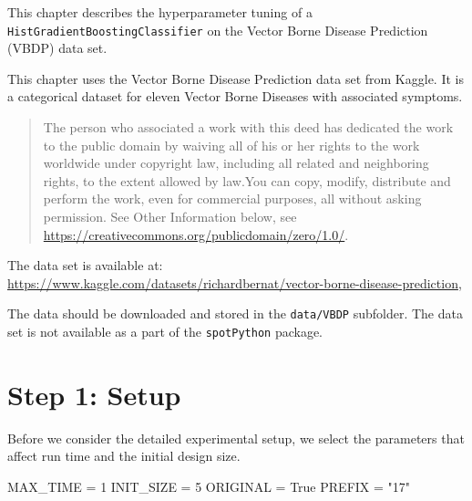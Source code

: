 \documentclass[
  letterpaper,
  DIV=11,
  numbers=noendperiod]{scrreprt}
\newenvironment{Shaded}{\begin{snugshade}}{\end{snugshade}}
\newcommand{\DecValTok}[1]{\textcolor[rgb]{0.68,0.00,0.00}{#1}}
\newcommand{\NormalTok}[1]{\textcolor[rgb]{0.00,0.23,0.31}{#1}}
\newcommand{\OperatorTok}[1]{\textcolor[rgb]{0.37,0.37,0.37}{#1}}
\newcommand{\StringTok}[1]{\textcolor[rgb]{0.13,0.47,0.30}{#1}}
\newcommand{\VariableTok}[1]{\textcolor[rgb]{0.07,0.07,0.07}{#1}}
\begin{document}
This chapter describes the hyperparameter tuning of a
\texttt{HistGradientBoostingClassifier} on the Vector Borne Disease
Prediction (VBDP) data set.

\begin{tcolorbox}[enhanced jigsaw, left=2mm, title=\textcolor{quarto-callout-important-color}{\faExclamation}\hspace{0.5em}{Vector Borne Disease Prediction Data Set}, bottomrule=.15mm, titlerule=0mm, breakable, rightrule=.15mm, toprule=.15mm, coltitle=black, colbacktitle=quarto-callout-important-color!10!white, leftrule=.75mm, arc=.35mm, colframe=quarto-callout-important-color-frame, bottomtitle=1mm, colback=white, opacitybacktitle=0.6, toptitle=1mm, opacityback=0]

This chapter uses the Vector Borne Disease Prediction data set from
Kaggle. It is a categorical dataset for eleven Vector Borne Diseases
with associated symptoms.

\begin{quote}
The person who associated a work with this deed has dedicated the work
to the public domain by waiving all of his or her rights to the work
worldwide under copyright law, including all related and neighboring
rights, to the extent allowed by law.You can copy, modify, distribute
and perform the work, even for commercial purposes, all without asking
permission. See Other Information below, see
\url{https://creativecommons.org/publicdomain/zero/1.0/}.
\end{quote}

The data set is available at:
\url{https://www.kaggle.com/datasets/richardbernat/vector-borne-disease-prediction},

The data should be downloaded and stored in the \texttt{data/VBDP}
subfolder. The data set is not available as a part of the
\texttt{spotPython} package.

\end{tcolorbox}

\hypertarget{sec-setup-17}{%
\section{Step 1: Setup}\label{sec-setup-17}}

Before we consider the detailed experimental setup, we select the
parameters that affect run time and the initial design size.

\begin{Shaded}
\begin{Highlighting}[]
\NormalTok{MAX\_TIME }\OperatorTok{=} \DecValTok{1}
\NormalTok{INIT\_SIZE }\OperatorTok{=} \DecValTok{5}
\NormalTok{ORIGINAL }\OperatorTok{=} \VariableTok{True}
\NormalTok{PREFIX }\OperatorTok{=} \StringTok{"17"}
\end{Highlighting}
\end{Shaded}
\end{document}
